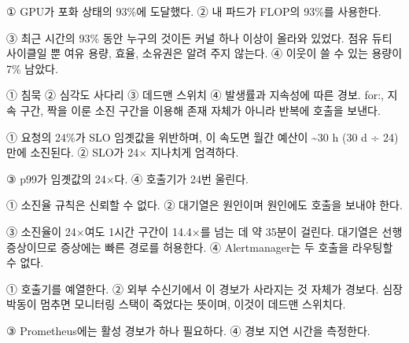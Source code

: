 
\begin{tbboptions}
  \item ① GPU가 포화 상태의 93\%에 도달했다.        ② 내 파드가 FLOP의 93\%를 사용한다.
  \item ③ 최근 시간의 93\% 동안 누구의 것이든 커널 하나 이상이 올라와 있었다. 점유 듀티 사이클일 뿐 여유 용량, 효율, 소유권은 알려 주지 않는다.        ④ 이웃이 쓸 수 있는 용량이 7\% 남았다.
\end{tbboptions}


\begin{tbboptions}
  \item ① 침묵        ② 심각도 사다리        ③ 데드맨 스위치        ④ 발생률과 지속성에 따른 경보. for:, 지속 구간, 짝을 이룬 소진 구간을 이용해 존재 자체가 아니라 반복에 호출을 보낸다.
\end{tbboptions}


\begin{tbboptions}
  \item ① 요청의 24\%가 SLO 임곗값을 위반하며, 이 속도면 월간 예산이 \textasciitilde{}30 h (30 d ÷ 24) 만에 소진된다.        ② SLO가 24× 지나치게 엄격하다.
  \item ③ p99가 임곗값의 24×다.        ④ 호출기가 24번 울린다.
\end{tbboptions}


\begin{tbboptions}
  \item ① 소진율 규칙은 신뢰할 수 없다.        ② 대기열은 원인이며 원인에도 호출을 보내야 한다.
  \item ③ 소진율이 24×여도 1시간 구간이 14.4×를 넘는 데 약 35분이 걸린다. 대기열은 선행 증상이므로 증상에는 빠른 경로를 허용한다.        ④ Alertmanager는 두 호출을 라우팅할 수 없다.
\end{tbboptions}


\begin{tbboptions}
  \item ① 호출기를 예열한다.        ② 외부 수신기에서 이 경보가 사라지는 것 자체가 경보다. 심장박동이 멈추면 모니터링 스택이 죽었다는 뜻이며, 이것이 데드맨 스위치다.
  \item ③ Prometheus에는 활성 경보가 하나 필요하다.        ④ 경보 지연 시간을 측정한다.
\end{tbboptions}

